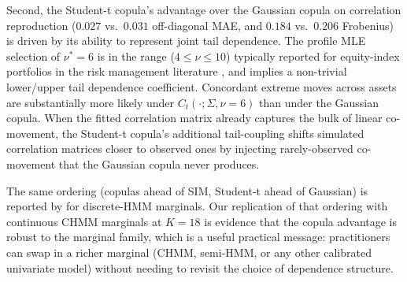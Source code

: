 Second, the Student-t copula's advantage over the Gaussian copula on correlation reproduction ($0.027$ vs.\ $0.031$ off-diagonal MAE, and $0.184$ vs.\ $0.206$ Frobenius) is driven by its ability to represent joint tail dependence.
The profile MLE selection of $\nu^* = 6$ is in the range ($4 \leq \nu \leq 10$) typically reported for equity-index portfolios in the risk management literature \cite{demarta2005tcopula, mcneil2015quantitative}, and implies a non-trivial lower/upper tail dependence coefficient.
Concordant extreme moves across assets are substantially more likely under $C_t(\cdot ; \Sigma, \nu = 6)$ than under the Gaussian copula.
When the fitted correlation matrix already captures the bulk of linear co-movement, the Student-t copula's additional tail-coupling shifts simulated correlation matrices closer to observed ones by injecting rarely-observed co-movement that the Gaussian copula never produces.

The same ordering (copulas ahead of SIM, Student-t ahead of Gaussian) is reported by \citet{alswaidan2026hybrid} for discrete-HMM marginals.
Our replication of that ordering with continuous CHMM marginals at $K = 18$ is evidence that the copula advantage is robust to the marginal family, which is a useful practical message: practitioners can swap in a richer marginal (CHMM, semi-HMM, or any other calibrated univariate model) without needing to revisit the choice of dependence structure.

